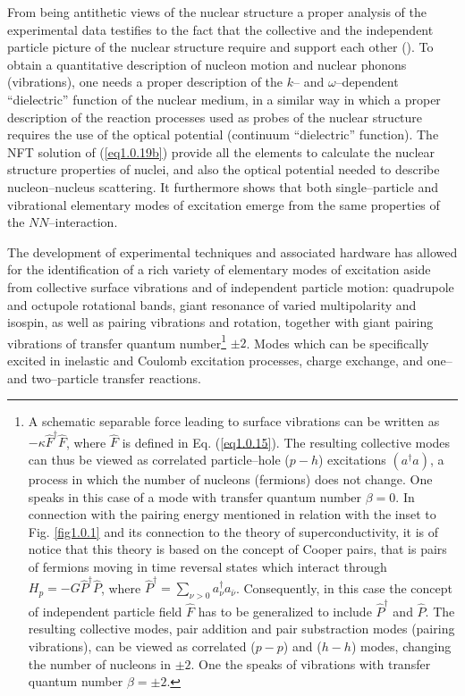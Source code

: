 \documentclass[a4paper,11pt]{book}
\numberwithin{equation}{section}
\numberwithin{figure}{section}
\numberwithin{table}{section}
\begin{document}
From being antithetic views of the nuclear structure a proper analysis of the experimental data testifies to the fact that the collective and the independent particle picture of the nuclear structure require and support each other (\cite{Bohr:75}). To obtain a quantitative description of nucleon  motion and nuclear phonons (vibrations), one needs a proper description of the $k$-- and $\omega$--dependent ``dielectric'' function of the nuclear medium, in a similar way in which a proper description of the reaction processes used as probes of the nuclear structure requires the use of the optical potential (continuum ``dielectric'' function). The NFT solution of (\ref{eq1.0.19b}) provide all the elements to calculate the nuclear structure properties of nuclei, and also  the optical potential needed to describe nucleon--nucleus scattering. It furthermore shows that both single--particle and vibrational elementary modes of excitation emerge from the same properties of the $NN$--interaction.


The development of experimental techniques and associated hardware has allowed for the identification of a rich variety of elementary modes of excitation aside from collective surface vibrations and of independent particle motion: quadrupole and octupole rotational bands, giant resonance of varied multipolarity and isospin, as well as pairing vibrations and rotation, together with giant pairing vibrations of transfer quantum number\footnote{A schematic separable force leading to surface vibrations can be written as $-\kappa \hat F^\dagger \hat F$, where $\hat F$ is defined in Eq. (\ref{eq1.0.15}). The resulting collective modes can thus be viewed as correlated particle--hole ($p-h$) excitations $(a^\dagger a)$, a process in which the number of nucleons (fermions) does not change. One speaks in this case of a mode with transfer quantum number $\beta=0$. In connection with the pairing energy mentioned in relation with the inset to Fig. \ref{fig1.0.1} and its connection to the theory of superconductivity, it is of notice that this theory is based on the concept of Cooper pairs, that is pairs of fermions moving in time reversal states which interact through $H_p=-G\hat P^\dagger \hat P$, where $\hat P^\dagger=\sum_{\nu>0}a_\nu^\dagger a_{\bar\nu}$. Consequently, in this case the concept of independent particle field $\hat F$ has to be generalized to include $\hat P^\dagger$ and $\hat P$. The resulting collective modes, pair addition and pair substraction modes (pairing vibrations), can be viewed as correlated ($p-p$) and ($h-h$) modes, changing the number of nucleons in $\pm 2$. One the speaks of vibrations with transfer quantum number $\beta = \pm 2$.} $\pm 2$. Modes which can be specifically excited in inelastic and Coulomb excitation processes, charge exchange, and one-- and two--particle transfer reactions.
\end{document}
